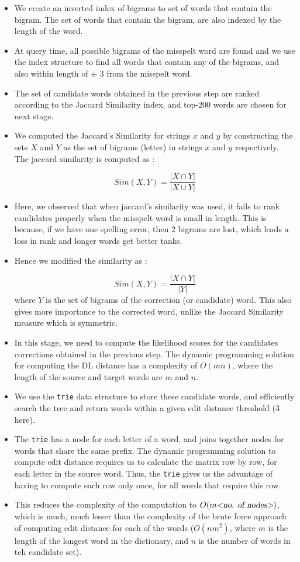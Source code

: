 \begin{itemize}
\itemsep1pt\parskip0pt
\item We create an inverted index of bigrams to set of words that contain the bigram. The set of words that contain the bigram, are also indexed by the length of the word. 
\item At query time, all possible bigrams of the misspelt word are found and we use the index structure to find all words that contain any of the bigrams, and also within length of $\pm$ 3 from the misspelt word. 
\item The set of candidate words obtained in the previous step are ranked according to the Jaccard Similarity index, and top-200 words are chosen for next stage.
\item We computed the Jaccard's Similarity for strings $x$ and $y$ by constructing the sets $X$ and $Y$ as the set of bigrams (letter) in strings $x$ and $y$ respectively. The jaccard similarity is computed as :

\[Sim(X,Y) = \frac{|X \cap Y|}{|X \cup Y|} \] 

\item Here, we observed that when jaccard's similarity was used, it fails to rank candidates properly when the misspelt word is small in length. This is because, if we have one spelling error, then 2 bigrams are lost, which leads a loss in rank and longer words get better tanks.
\item Hence we modified the similarity as :

\[Sim(X,Y) = \frac{|X \cap Y|}{|Y|} \] 
 where $Y$ is the set of bigrams of the correction (or candidate) word. This also gives more importance to the corrected word, unlike the Jaccard Similarity measure which is symmetric.

\item In this stage, we need to compute the likelihood scores for the candidates corrections obtained in the previous step. The dynamic programming solution for computing the DL distance has a complexity of $O(mn)$, where the length of the source and target words are $m$ and $n$.
\item We use the \texttt{trie} data structure to store these candidate words, and efficiently search the tree and return words within a given edit distance threshold ($3$ here).
\item The \texttt{trie} has a node for each letter of a word, and joins together nodes for words that share the same prefix. The dynamic programming solution to compute edit distance requires us to calculate the matrix row by row, for each letter in the source word. Thus, the \texttt{trie} gives us the advantage of having to compute each row only once, for all words that require this row.
\item This reduces the complexity of the computation to $O(m\textsl{<no. of nodes>})$, which is much, much lesser than the complexity of the brute force approach of computing edit distance for each of the words ($O(nm^2)$, where $m$ is the length of the longest word in the dictionary, and $n$ is the number of words in teh candidate set).


\end{itemize}
